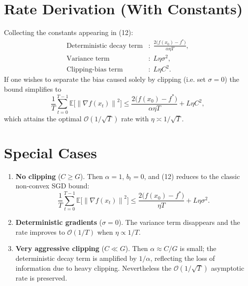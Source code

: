 \documentclass{article}
\newcommand{\EE}{\mathbb{E}}
\newcommand{\norm}[1]{\left\lVert#1\right\rVert}
\begin{document}
\section*{Rate Derivation (With Constants)}
Collecting the constants appearing in (12):
\[
\begin{aligned}
\text{Deterministic decay term} &:\; \frac{2\bigl(f(x_{0})-f^{*}\bigr)}{\alpha\eta T},\\[2pt]
\text{Variance term}            &:\; L\eta\sigma^{2},\\[2pt]
\text{Clipping‑bias term}       &:\; L\eta C^{2}.
\end{aligned}
\]
If one wishes to separate the bias caused solely by clipping (i.e. set $\sigma=0$) the bound simplifies to
\[
\frac{1}{T}\sum_{t=0}^{T-1}\EE\!\bigl[\norm{\nabla f(x_{t})}^{2}\bigr]
\le \frac{2\bigl(f(x_{0})-f^{*}\bigr)}{\alpha\eta T}+L\eta C^{2},
\]
which attains the optimal $\mathcal{O}(1/\sqrt{T})$ rate with $\eta\asymp 1/\sqrt{T}$.

\section*{Special Cases}
\begin{enumerate}[label=\alph*)]
\item \textbf{No clipping} ($C\ge G$). Then $\alpha=1$, $b_{t}=0$, and (12) reduces to the classic non‑convex SGD bound:
\[
\frac{1}{T}\sum_{t=0}^{T-1}\EE\!\bigl[\norm{\nabla f(x_{t})}^{2}\bigr]
\le \frac{2\bigl(f(x_{0})-f^{*}\bigr)}{\eta T}+L\eta\sigma^{2}.
\]
\item \textbf{Deterministic gradients} ($\sigma=0$). The variance term disappears and the rate improves to $\mathcal{O}(1/T)$ when $\eta\propto 1/T$.
\item \textbf{Very aggressive clipping} ($C\ll G$). Then $\alpha\approx C/G$ is small; the deterministic decay term is amplified by $1/\alpha$, reflecting the loss of information due to heavy clipping. Nevertheless the $\mathcal{O}(1/\sqrt{T})$ asymptotic rate is preserved.
\end{enumerate}
\end{document}

